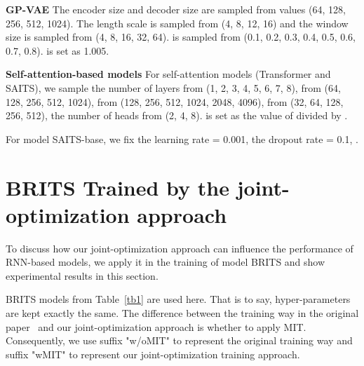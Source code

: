 \documentclass{article}
\begin{document}
\textbf{GP-VAE} \hspace{1em}
The encoder size and decoder size are sampled from values (64, 128, 256, 512, 1024). The length scale is sampled from (4, 8, 12, 16) and the window size is sampled from (4, 8, 16, 32, 64).  is sampled from (0.1, 0.2, 0.3, 0.4, 0.5, 0.6, 0.7, 0.8).  is set as 1.005.

\textbf{Self-attention-based models} \hspace{1em} 
For self-attention models (Transformer and SAITS), we sample the number of layers  from (1, 2, 3, 4, 5, 6, 7, 8),  from (64, 128, 256, 512, 1024),  from (128, 256, 512, 1024, 2048, 4096),  from (32, 64, 128, 256, 512), the number of heads  from (2, 4, 8).  is set as the value of  divided by .

For model SAITS-base, we fix the learning rate = 0.001, the dropout rate = 0.1, .

\section{BRITS Trained by the joint-optimization approach} \label{BRITS_apply_MIT}
\begin{table} [ht]
	\caption{Performance comparison between BRITS trained without MIT and with MIT.}
	\label{BRITS_MIT_results}
	\centering
	\begin{minipage}{1\textwidth}
\end{minipage}
\end{table}

To discuss how our joint-optimization approach can influence the performance of RNN-based models, we apply it in the training of model BRITS and show experimental results in this section. 

BRITS models from Table~\ref{tb1} are used here. That is to say, hyper-parameters are kept exactly the same. The difference between the training way in the original paper~\cite{Cao2018BRITS} and our joint-optimization approach is whether to apply MIT. Consequently, we use suffix "w/oMIT" to represent the original training way and suffix "wMIT" to represent our joint-optimization training approach.
\end{document}
